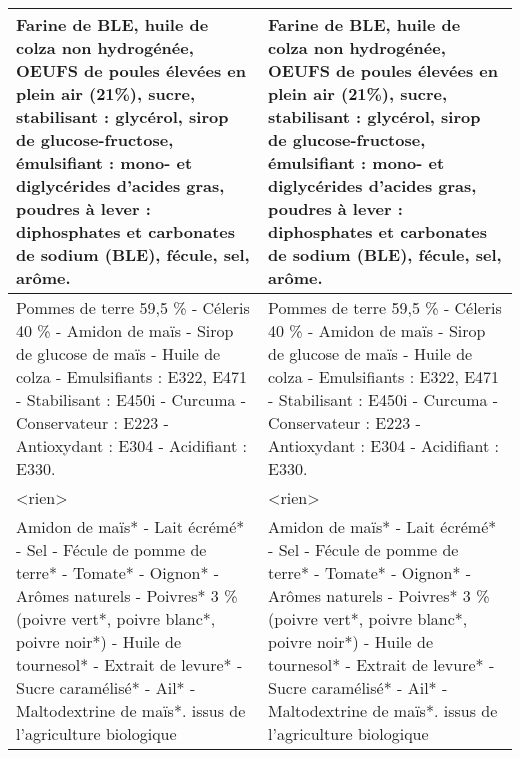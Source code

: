 \begin{tabular}{p{7cm}p{7cm}}
                                                                    Farine de BLE, huile de colza non hydrogénée, OEUFS de poules élevées en plein air (21\%), sucre, stabilisant : glycérol, sirop de glucose-fructose, émulsifiant : mono- et diglycérides d'acides gras, poudres à lever : diphosphates et carbonates de sodium (BLE), fécule, sel, arôme. &                                                                         Farine de BLE, huile de colza non hydrogénée, OEUFS de poules élevées en plein air (21\%), sucre, stabilisant : glycérol, sirop de glucose-fructose, émulsifiant : mono- et diglycérides d'acides gras,  \newline poudres à lever : diphosphates et carbonates de sodium (BLE), fécule, sel, arôme. \\ \hline
                                                                                                                              Pommes de terre 59,5 \% - Céleris 40 \% - Amidon de maïs - Sirop de glucose de maïs - Huile de colza - Emulsifiants : E322, E471 - Stabilisant : E450i - Curcuma - Conservateur : E223 - Antioxydant : E304 - Acidifiant : E330. &                                                                                                                                   Pommes de terre 59,5 \% - Céleris 40 \% - Amidon de maïs - Sirop de glucose de maïs - Huile de colza - Emulsifiants : E322, E471 - Stabilisant : E450i  \newline - Curcuma - Conservateur : E223 - Antioxydant : E304 - Acidifiant : E330. \\ \hline
                                                                                                                                                                                                                                                                                                                                                      <rien> &                                                                                                                                                                                                                                                                                                                                                             <rien> \\ \hline
                                                      Amidon de maïs* - Lait écrémé* - Sel - Fécule de pomme de terre* - Tomate* - Oignon* - Arômes naturels - Poivres* 3 \% (poivre vert*, poivre blanc*, poivre noir*) - Huile de tournesol* - Extrait de levure* - Sucre caramélisé* - Ail* - Maltodextrine de maïs*. \newline * issus de l'agriculture biologique &                                                          Amidon de maïs* - Lait écrémé* - Sel - Fécule de pomme de terre* - Tomate* - Oignon* - Arômes naturels - Poivres* 3 \% (poivre vert*, poivre blanc*,  \newline poivre noir*) - Huile de tournesol* - Extrait de levure* - Sucre caramélisé* - Ail* - Maltodextrine de maïs*.  \newline * issus de l’agriculture biologique \\ \hline

\end{tabular}
